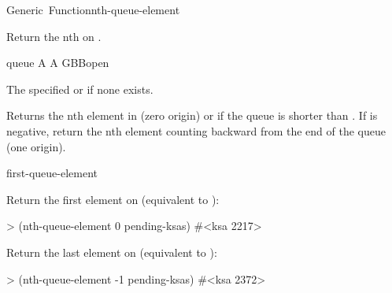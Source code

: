 \documentclass[10pt,twoside,english,pdftex]{article}
\begin{document}
\begin{functiondoc}{Generic~Function}{nth-queue-element}{ 
    \returns{} }
%

\fnsyntax

\fnpurpose Return the nth  on .

\fnmethods
{}

\fnpackage {}

\fnmodule {}

\fnargs
\begin{args}{queue}
\arg[n] A 
\arg[queue] A GBBopen 
\end{args}

\fnreturns The specified  or \nil{} if none exists.
  
\fndescription Returns the nth element in  (zero origin) or
\nil{} if the queue is shorter than .  If  is negative,
return the nth element counting backward from the end of the queue (one
origin).

\begin{alsos}{first-queue-element}
\end{alsos}

%
%
\fnexamples
Return the first element on  (equivalent to
\textbf{}):
\begin{example}
> (nth-queue-element 0 pending-ksas)
#<ksa 2217>
\end{example}
Return the last element on  (equivalent to
\textbf{}):
\begin{example}
> (nth-queue-element -1 pending-ksas)
#<ksa 2372>
\end{example}

\end{functiondoc}

\end{document}
